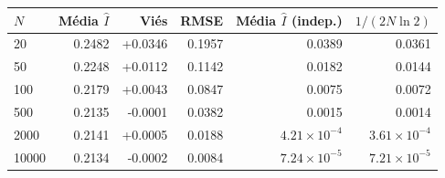 \begin{tabular}{lrrrrr}
\toprule
$N$ & Média $\hat I$ & Viés & RMSE & Média $\hat I$ (indep.) & $1/(2N\ln 2)$ \\
\midrule
20 & 0.2482 & +0.0346 & 0.1957 & 0.0389 & 0.0361 \\
50 & 0.2248 & +0.0112 & 0.1142 & 0.0182 & 0.0144 \\
100 & 0.2179 & +0.0043 & 0.0847 & 0.0075 & 0.0072 \\
500 & 0.2135 & -0.0001 & 0.0382 & 0.0015 & 0.0014 \\
2000 & 0.2141 & +0.0005 & 0.0188 & $4.21\times 10^{-4}$ & $3.61\times 10^{-4}$ \\
10000 & 0.2134 & -0.0002 & 0.0084 & $7.24\times 10^{-5}$ & $7.21\times 10^{-5}$ \\
\bottomrule
\end{tabular}
